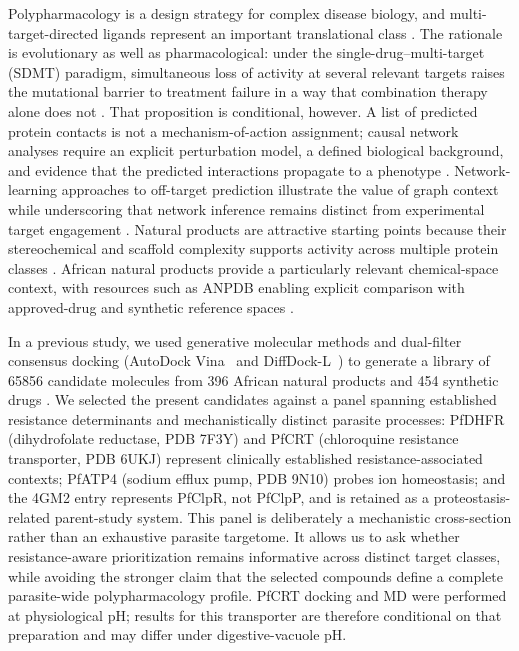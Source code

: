 \documentclass[journal=jcisd8,manuscript=article,layout=traditional]{achemso}
\begin{document}
Polypharmacology is a design strategy for complex disease biology, and multi-target-directed ligands represent an important translational class \citep{Ryszkiewicz2026MTDL}. The rationale is evolutionary as well as pharmacological: under the single-drug--multi-target (SDMT) paradigm, simultaneous loss of activity at several relevant targets raises the mutational barrier to treatment failure in a way that combination therapy alone does not \citep{sdmt2026trends,sdmt_trends_parasitology_2026}. That proposition is conditional, however. A list of predicted protein contacts is not a mechanism-of-action assignment; causal network analyses require an explicit perturbation model, a defined biological background, and evidence that the predicted interactions propagate to a phenotype \citep{Trapotsi2022MoA}. Network-learning approaches to off-target prediction illustrate the value of graph context while underscoring that network inference remains distinct from experimental target engagement \citep{Sentinel2025Offtarget}. Natural products are attractive starting points because their stereochemical and scaffold complexity supports activity across multiple protein classes \citep{polypharmacology_malaria_2026,value_addition_african_np_2025}. African natural products provide a particularly relevant chemical-space context, with resources such as ANPDB enabling explicit comparison with approved-drug and synthetic reference spaces \citep{anpdb_2026}.

In a previous study, we used generative molecular methods and dual-filter consensus docking (AutoDock Vina~\citep{vina_2021} and DiffDock-L~\citep{diffdock_2023}) to generate a library of \num{65856} candidate molecules from 396 African natural products and 454 synthetic drugs \citep{temgoua2026chemrxiv}. We selected the present candidates against a panel spanning established resistance determinants and mechanistically distinct parasite processes: PfDHFR (dihydrofolate reductase, PDB 7F3Y) and PfCRT (chloroquine resistance transporter, PDB 6UKJ) represent clinically established resistance-associated contexts; PfATP4 (sodium efflux pump, PDB 9N10) probes ion homeostasis; and the 4GM2 entry represents PfClpR, not PfClpP, and is retained as a proteostasis-related parent-study system. This panel is deliberately a mechanistic cross-section rather than an exhaustive parasite targetome. It allows us to ask whether resistance-aware prioritization remains informative across distinct target classes, while avoiding the stronger claim that the selected compounds define a complete parasite-wide polypharmacology profile. PfCRT docking and MD were performed at physiological pH; results for this transporter are therefore conditional on that preparation and may differ under digestive-vacuole pH.
\end{document}
